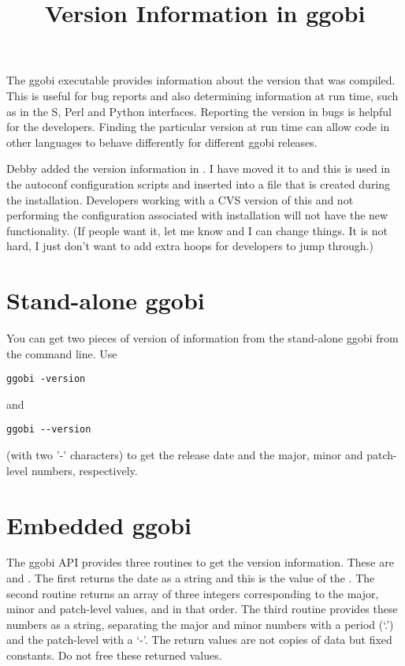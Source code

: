 \documentclass{article}
\title{Version Information in ggobi}
\begin{document}
\maketitle
The ggobi executable provides information about the version that was
compiled. This is useful for bug reports and also determining
information at run time, such as in the S, Perl and Python interfaces.
Reporting the version in bugs is helpful for the developers.  Finding
the particular version at run time can allow code in other languages
to behave differently for different ggobi releases.

Debby added the version information in .  I have moved
it to  and this is used in the autoconf
configuration scripts and inserted into a file  that is
created during the installation.  Developers working with a CVS
version of this and not performing the configuration associated with
installation will not have the new functionality. (If people want it,
let me know and I can change things.  It is not hard, I just don't
want to add extra hoops for developers to jump through.)

\section{Stand-alone ggobi}
You can get two pieces of version of information
from the stand-alone ggobi from the command line.
Use 
\begin{verbatim}
ggobi -version
\end{verbatim}
and
\begin{verbatim}
ggobi --version
\end{verbatim}
(with two '-' characters)
to get
the release date and
the major, minor and patch-level numbers,
respectively.

\section{Embedded ggobi}

The ggobi API provides three routines to get the version information.
These are  and
.  The first returns the date as a
string and this is the value of the .
The second routine returns an array of three integers corresponding to
the major, minor and patch-level values, and in that order.  The third
routine provides these numbers as a string, separating the major and
minor numbers with a period (`.') and the patch-level with a `-'.  The
return values are not copies of data but fixed constants. Do not free
these returned values.
\end{document}
